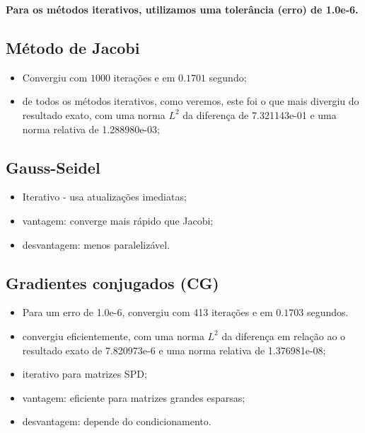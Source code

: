 \documentclass{article} %
\theoremstyle{definition}
\begin{document}
        \bigbreak
        \textbf{Para os métodos iterativos, utilizamos uma tolerância (erro) de 1.0e-6.}
        \subsection*{Método de Jacobi}
            \begin{itemize}
                \item Convergiu com $1000$ iterações e em $0.1701$ segundo;
                \item de todos os métodos iterativos, como veremos, este foi o que mais divergiu
                    do resultado exato, com uma norma $L^2$ da diferença de 7.321143e-01 e uma
                    norma relativa de 1.288980e-03;
            \end{itemize}
        \subsection*{Gauss-Seidel}
            \begin{itemize}
                \item Iterativo - usa atualizações imediatas;
                \item vantagem: converge mais rápido que Jacobi;
                \item desvantagem: menos paralelizável.
            \end{itemize}

        \subsection*{Gradientes conjugados (CG)}

            \begin{itemize}
                \item Para um erro de 1.0e-6, convergiu com 413 iterações e em $0.1703$ segundos.
                \item convergiu eficientemente, com uma norma $L^2$ da diferença em relação ao
                    o resultado exato de 7.820973e-6 e uma norma relativa de 1.376981e-08;
                \item iterativo para matrizes SPD;
                \item vantagem: eficiente para matrizes grandes esparsas;
                \item desvantagem: depende do condicionamento.
            \end{itemize}
\end{document}

